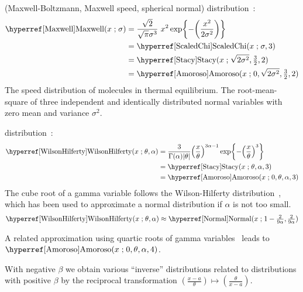  (Maxwell-Boltzmann, Maxwell speed, spherical normal) distribution~\cite{Maxwell1860, Abramowitz1965}:
%
\begin{align}
\label{Maxwell}
\opr{Maxwell}(x \given \sigma) 
&= \frac{\sqrt{2}}{\sqrt{\pi} \sigma^3}\ x^2 \exp\Left\{-\Left(\frac{x^2}{2\sigma^2}\Right)\Right\}  \checked
 \\
&=\opr{ScaledChi}(x \given \sigma, 3) \checked \notag \\
&=  \opr{Stacy}(x\given  \sqrt{2\sigma^2} ,\tfrac{3}{2},2) \notag  \checked\\
&=  \opr{Amoroso}(x\given  0, \sqrt{2\sigma^2} , \tfrac{3}{2}, 2) \notag  \checked
\end{align}
The speed distribution of molecules in thermal equilibrium. The root-mean-square of three independent and identically distributed normal variables with zero mean and variance $\sigma^2$.



 distribution~\cite{Wilson1931,Johnson1994}:
\begin{align}
\label{WilsonHilferty}
\opr{WilsonHilferty}(x \given \theta, \alpha) 
&= \frac{3}{\Gamma(\alpha)|\theta|} \Left(\frac{x}{\theta}\Right)^{3 \alpha-1} \exp\Left\{-\Left(\frac{x}{\theta}\Right)^{3}\Right\}
\checked
\\ 
&=  \opr{Stacy}(x\given \theta, \alpha, 3) \checked
\notag 
\\ &=  \opr{Amoroso}(x\given  0, \theta, \alpha, 3) \checked
\notag
\end{align}
The cube root of a gamma variable follows the Wilson-Hilferty distribution~\cite{Wilson1931}, which has been used to approximate a normal distribution if $\alpha$ is not too small.
\[
\opr{WilsonHilferty}(x \given \theta, \alpha)  \approx \opr{Normal}(x \given 1-\sfrac{2}{9\alpha},  \sfrac{2}{9\alpha} )
\checked
\notag
\]


A related approximation using quartic roots of gamma variables~\cite{Hawkins1986} leads to   $\opr{Amoroso}(x\given  0, \theta, \alpha, 4)$.





With negative $\beta$ we obtain various ``inverse'' distributions related to distributions with positive $\beta$ by the reciprocal transformation $ (\tfrac{x-a}{\theta} ) \mapsto (\tfrac{\theta}{x-a} )$.



